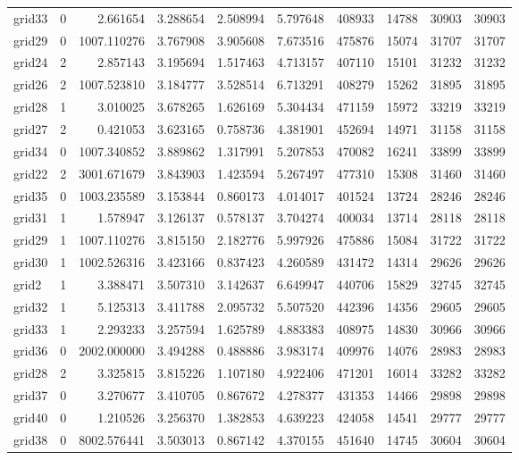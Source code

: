 \documentclass[../../../thesis.tex]{subfiles}
\begin{document}
\begin{longtable}{|l|r|r|r|r|r|r|r|r|r|}
grid33 & 0 & 2.661654 & 3.288654 & 2.508994 & 5.797648 & 408933 & 14788 & 30903 & 30903 \\
grid29 & 0 & 1007.110276 & 3.767908 & 3.905608 & 7.673516 & 475876 & 15074 & 31707 & 31707 \\
grid24 & 2 & 2.857143 & 3.195694 & 1.517463 & 4.713157 & 407110 & 15101 & 31232 & 31232 \\
grid26 & 2 & 1007.523810 & 3.184777 & 3.528514 & 6.713291 & 408279 & 15262 & 31895 & 31895 \\
grid28 & 1 & 3.010025 & 3.678265 & 1.626169 & 5.304434 & 471159 & 15972 & 33219 & 33219 \\
grid27 & 2 & 0.421053 & 3.623165 & 0.758736 & 4.381901 & 452694 & 14971 & 31158 & 31158 \\
grid34 & 0 & 1007.340852 & 3.889862 & 1.317991 & 5.207853 & 470082 & 16241 & 33899 & 33899 \\
grid22 & 2 & 3001.671679 & 3.843903 & 1.423594 & 5.267497 & 477310 & 15308 & 31460 & 31460 \\
grid35 & 0 & 1003.235589 & 3.153844 & 0.860173 & 4.014017 & 401524 & 13724 & 28246 & 28246 \\
grid31 & 1 & 1.578947 & 3.126137 & 0.578137 & 3.704274 & 400034 & 13714 & 28118 & 28118 \\
grid29 & 1 & 1007.110276 & 3.815150 & 2.182776 & 5.997926 & 475886 & 15084 & 31722 & 31722 \\
grid30 & 1 & 1002.526316 & 3.423166 & 0.837423 & 4.260589 & 431472 & 14314 & 29626 & 29626 \\
grid2 & 1 & 3.388471 & 3.507310 & 3.142637 & 6.649947 & 440706 & 15829 & 32745 & 32745 \\
grid32 & 1 & 5.125313 & 3.411788 & 2.095732 & 5.507520 & 442396 & 14356 & 29605 & 29605 \\
grid33 & 1 & 2.293233 & 3.257594 & 1.625789 & 4.883383 & 408975 & 14830 & 30966 & 30966 \\
grid36 & 0 & 2002.000000 & 3.494288 & 0.488886 & 3.983174 & 409976 & 14076 & 28983 & 28983 \\
grid28 & 2 & 3.325815 & 3.815226 & 1.107180 & 4.922406 & 471201 & 16014 & 33282 & 33282 \\
grid37 & 0 & 3.270677 & 3.410705 & 0.867672 & 4.278377 & 431353 & 14466 & 29898 & 29898 \\
grid40 & 0 & 1.210526 & 3.256370 & 1.382853 & 4.639223 & 424058 & 14541 & 29777 & 29777 \\
grid38 & 0 & 8002.576441 & 3.503013 & 0.867142 & 4.370155 & 451640 & 14745 & 30604 & 30604 \\

\end{longtable}
\end{document}
